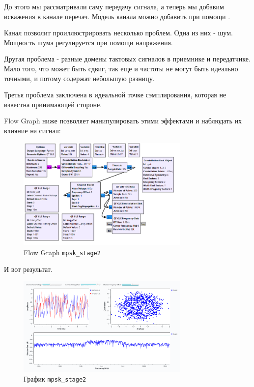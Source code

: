 \documentclass[a4paper,12pt]{report}
\begin{document}
    До этого мы рассматривали саму передачу сигнала, а теперь мы добавим искажения в канале перечач. Модель канала можно добавить при помощи .
    
    Канал позволит проиллюстрировать несколько проблем. Одна из них - шум. Мощность шума регулируется при помощи напряжения.
    
    Другая проблема - разные домены тактовых сигналов в приемнике и передатчике. Мало того, что может быть сдвиг, так еще и частоты не могут быть идеально точными, и потому содержат небольшую разницу.
    
    Третья проблема заключена в идеальной точке сэмплирования, которая не известна принимающей стороне.
    
    Flow Graph ниже позволяет манипулировать этими эффектами и наблюдать их влияние на сигнал:
    
    \begin{figure}[H]
        \centering
        \includegraphics[width=0.75\textwidth]{images/mpsk_stage2_fg.png}
        \caption{Flow Graph \texttt{mpsk\_stage2}}
        \label{fig:mpsk_stage2_fg}
    \end{figure}
    
    И вот результат.
    
    \begin{figure}[H]
        \centering
        \includegraphics[width=0.75\textwidth]{images/mpsk_stage2_plot.png}
        \caption{График \texttt{mpsk\_stage2}}
        \label{fig:mpsk_stage2_plot}
    \end{figure}
    
\end{document}
